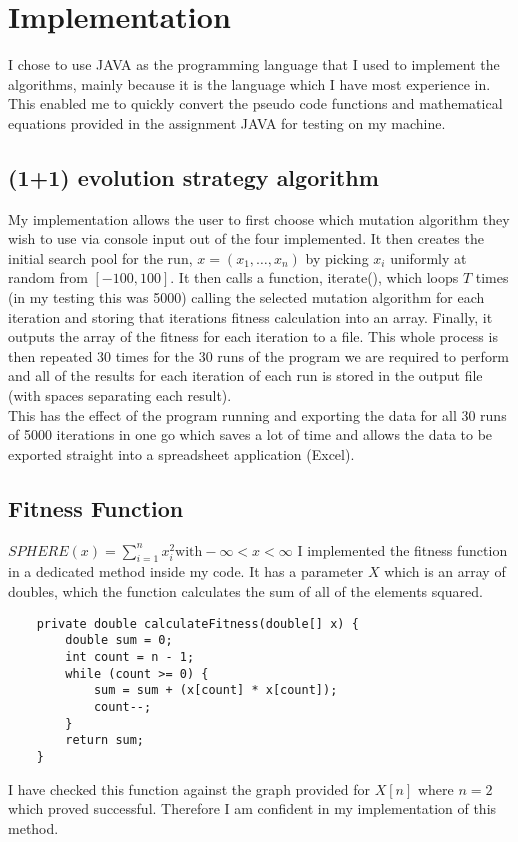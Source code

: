 \documentclass{article}
\begin{document}
    \section{Implementation}
    I chose to use JAVA as the programming language that I used to implement the algorithms, mainly because it is the language which I have most experience in. This enabled me to quickly convert the pseudo code functions and mathematical equations provided in the assignment JAVA for testing on my machine.\\
    
    \subsection{(1+1) evolution strategy algorithm}
    My implementation allows the user to first choose which mutation algorithm they wish to use via console input out of the four implemented. It then creates the initial search pool for the run, $x = (x_1,\dotsc, x_n)$ by picking $x_i$  uniformly at random from $[-100, 100]$. It then calls a function, iterate(), which loops $T$ times (in my testing this was 5000) calling the selected mutation algorithm for each iteration and storing that iterations fitness calculation into an array. Finally, it outputs the array of the fitness for each iteration to a file. This whole process is then repeated 30 times for the 30 runs of the program we are required to perform and all of the results for each iteration of each run is stored in the output file (with spaces separating each result).\\
    
    This has the effect of the program running and exporting the data for all 30 runs of 5000 iterations in one go which saves a lot of time and allows the data to be exported straight into a spreadsheet application (Excel).\\
    
    \subsection{Fitness Function}
    $\displaystyle SPHERE(x) = \sum_{i=1}^{n} x_i^2  \text{with}  -\infty < x < \infty$
    I implemented the fitness function in a dedicated method inside my code. It has a parameter $X$ which is an array of doubles, which the function calculates the sum of all of the elements squared.
    \begin{lstlisting}
    private double calculateFitness(double[] x) {
		double sum = 0;
		int count = n - 1;
		while (count >= 0) {
			sum = sum + (x[count] * x[count]);
			count--;
		}
		return sum;
	}
    \end{lstlisting}
    I have checked this function against the graph provided for $X[n]$ where $n=2$ which proved successful. Therefore I am confident in my implementation of this method.
    
\end{document}

